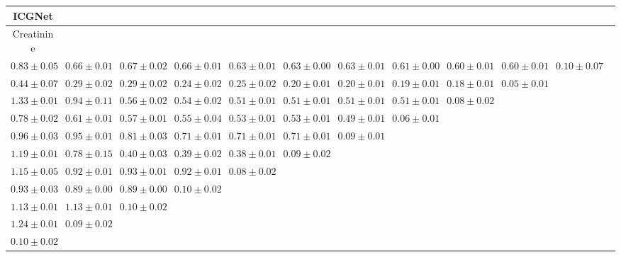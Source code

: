 \begin{table}[ht]
{{\begin{adjustbox}{width=\textwidth}
\begin{tabular}{cccccccccccc}
\hline
ICGNet &  &  &  &  &  &  &  &  &  & \\
\hline
Creatinine &  &  &  &  &  &  &  &  &  & \\
\hline
$0.83 \pm 0.05$ & $0.66 \pm 0.01$ & $0.67 \pm 0.02$ & $0.66 \pm 0.01$ & $0.63 \pm 0.01$ & $0.63 \pm 0.00$ & $0.63 \pm 0.01$ & $0.61 \pm 0.00$ & $0.60 \pm 0.01$ & $0.60 \pm 0.01$ & $0.10 \pm 0.07$ &  \\
$0.44 \pm 0.07$ & $0.29 \pm 0.02$ & $0.29 \pm 0.02$ & $0.24 \pm 0.02$ & $0.25 \pm 0.02$ & $0.20 \pm 0.01$ & $0.20 \pm 0.01$ & $0.19 \pm 0.01$ & $0.18 \pm 0.01$ & $0.05 \pm 0.01$ &  &  \\
$1.33 \pm 0.01$ & $0.94 \pm 0.11$ & $0.56 \pm 0.02$ & $0.54 \pm 0.02$ & $0.51 \pm 0.01$ & $0.51 \pm 0.01$ & $0.51 \pm 0.01$ & $0.51 \pm 0.01$ & $0.08 \pm 0.02$ &  &  &  \\
$0.78 \pm 0.02$ & $0.61 \pm 0.01$ & $0.57 \pm 0.01$ & $0.55 \pm 0.04$ & $0.53 \pm 0.01$ & $0.53 \pm 0.01$ & $0.49 \pm 0.01$ & $0.06 \pm 0.01$ &  &  &  &  \\
$0.96 \pm 0.03$ & $0.95 \pm 0.01$ & $0.81 \pm 0.03$ & $0.71 \pm 0.01$ & $0.71 \pm 0.01$ & $0.71 \pm 0.01$ & $0.09 \pm 0.01$ &  &  &  &  &  \\
$1.19 \pm 0.01$ & $0.78 \pm 0.15$ & $0.40 \pm 0.03$ & $0.39 \pm 0.02$ & $0.38 \pm 0.01$ & $0.09 \pm 0.02$ &  &  &  &  &  &  \\
$1.15 \pm 0.05$ & $0.92 \pm 0.01$ & $0.93 \pm 0.01$ & $0.92 \pm 0.01$ & $0.08 \pm 0.02$ &  &  &  &  &  &  &  \\
$0.93 \pm 0.03$ & $0.89 \pm 0.00$ & $0.89 \pm 0.00$ & $0.10 \pm 0.02$ &  &  &  &  &  &  &  &  \\
$1.13 \pm 0.01$ & $1.13 \pm 0.01$ & $0.10 \pm 0.02$ &  &  &  &  &  &  &  &  &  \\
$1.24 \pm 0.01$ & $0.09 \pm 0.02$ &  &  &  &  &  &  &  &  &  &  \\
$0.10 \pm 0.02$ &  &  &  &  &  &  &  &  &  &  &  \\




\end{tabular}
\end{adjustbox}}}
\end{table}
